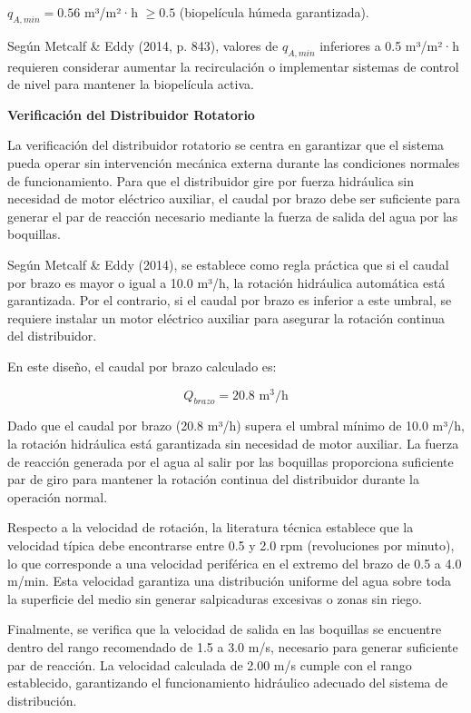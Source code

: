 \documentclass[12pt,a4paper]{article}
\begin{document}
$q_{A,min} = 0.56$ m³/m²·h $\geq 0.5$ (biopelícula húmeda garantizada).

Según Metcalf \& Eddy (2014, p. 843), valores de $q_{A,min}$ inferiores a 0.5 m³/m²·h requieren considerar aumentar la recirculación o implementar sistemas de control de nivel para mantener la biopelícula activa.

\textbf{Verificación del Distribuidor Rotatorio}

La verificación del distribuidor rotatorio se centra en garantizar que el sistema pueda operar sin intervención mecánica externa durante las condiciones normales de funcionamiento. Para que el distribuidor gire por fuerza hidráulica sin necesidad de motor eléctrico auxiliar, el caudal por brazo debe ser suficiente para generar el par de reacción necesario mediante la fuerza de salida del agua por las boquillas.

Según Metcalf \& Eddy (2014), se establece como regla práctica que si el caudal por brazo es mayor o igual a 10.0 m³/h, la rotación hidráulica automática está garantizada. Por el contrario, si el caudal por brazo es inferior a este umbral, se requiere instalar un motor eléctrico auxiliar para asegurar la rotación continua del distribuidor.

En este diseño, el caudal por brazo calculado es:

\begin{equation}
Q_{brazo} = 20.8 \text{ m}^3\text{/h}
\end{equation}

Dado que el caudal por brazo (20.8 m³/h) supera el umbral mínimo de 10.0 m³/h, la rotación hidráulica está garantizada sin necesidad de motor auxiliar. La fuerza de reacción generada por el agua al salir por las boquillas proporciona suficiente par de giro para mantener la rotación continua del distribuidor durante la operación normal.

Respecto a la velocidad de rotación, la literatura técnica establece que la velocidad típica debe encontrarse entre 0.5 y 2.0 rpm (revoluciones por minuto), lo que corresponde a una velocidad periférica en el extremo del brazo de 0.5 a 4.0 m/min. Esta velocidad garantiza una distribución uniforme del agua sobre toda la superficie del medio sin generar salpicaduras excesivas o zonas sin riego.

Finalmente, se verifica que la velocidad de salida en las boquillas se encuentre dentro del rango recomendado de 1.5 a 3.0 m/s, necesario para generar suficiente par de reacción. La velocidad calculada de 2.00 m/s cumple con el rango establecido, garantizando el funcionamiento hidráulico adecuado del sistema de distribución.
\end{document}
